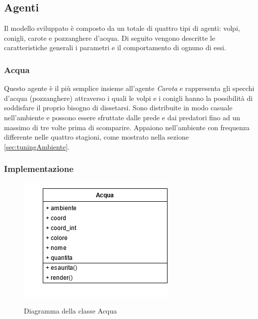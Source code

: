 \documentclass[11pt]{article}
\begin{document}
\subsection{Agenti}
Il modello sviluppato è composto da un totale di quattro tipi di agenti: volpi, conigli, carote e pozzanghere d'acqua. Di seguito vengono descritte le caratteristiche generali i parametri e il comportamento di ognuno di essi. 

\subsubsection{Acqua}
Questo agente è il più semplice insieme all'agente \emph{Carota} e rappresenta gli specchi d'acqua (pozzanghere) attraverso i quali le volpi e i conigli hanno la possibilità di soddisfare il proprio bisogno di dissetarsi. Sono distribuite in modo casuale nell'ambiente e possono essere sfruttate dalle prede e dai predatori fino ad un massimo di tre volte prima di scomparire. Appaiono nell'ambiente con frequenza differente nelle quattro stagioni, come mostrato nella sezione \ref{sec:tuningAmbiente}.  

\subsubsection{Implementazione}
\begin{figure}[h!]
     \centering
     \includegraphics[scale = 0.7]{Acqua.png}
     \label{fig:acquaUML}
     \caption{Diagramma della classe Acqua}
\end{figure}
\end{document}
